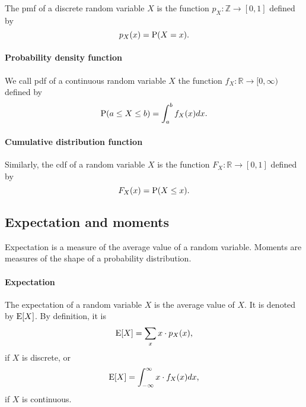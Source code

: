 The \gls{pmf} of a discrete random variable $X$ is the
function $p_X : \mathbb{Z} \rightarrow [0, 1]$ defined by
\begin{equation}
  \label{eq:pmf}
  p_X(x) = \operatorname{P}(X = x)\text{.}
\end{equation}

\paragraph{Probability density function}

We call \gls{pdf} of a continuous random variable $X$ the
function $f_X : \mathbb{R} \rightarrow [0, \infty)$ defined by
\begin{equation}
  \label{eq:pdf}
  \operatorname{P}(a \leq X \leq b) = \int_a^b f_X(x) dx\text{.}
\end{equation}

\paragraph{Cumulative distribution function}

Similarly, the \gls{cdf} of a random variable $X$ is the function
$F_X : \mathbb{R} \rightarrow [0, 1]$ defined by
\begin{equation}
  \label{eq:cdf}
  F_X(x) = \operatorname{P}(X \leq x)\text{.}
\end{equation}

\subsection{Expectation and moments}

Expectation is a measure of the average value of a random variable.  Moments are
measures of the shape of a probability distribution.

\paragraph{Expectation}  The expectation of a random variable $X$ is the average
value of $X$.  It is denoted by $\operatorname{E}[X]$.  By definition, it is
\begin{equation*}
  \operatorname{E}[X] = \sum_{x} x \cdot p_X(x)\text{,}
\end{equation*}
if $X$ is discrete, or
\begin{equation*}
  \operatorname{E}[X] = \int_{-\infty}^{\infty} x \cdot f_X(x) dx\text{,}
\end{equation*}
if $X$ is continuous.

